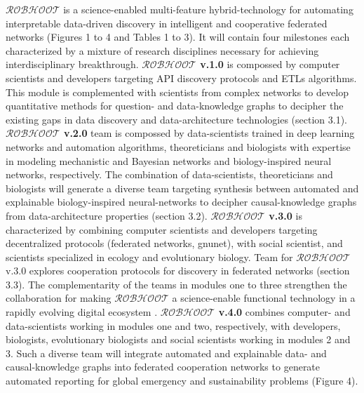 \documentclass[11pt, a4paper]{article} %
\begin{document}
  {\bf $\mathcal{ROBHOOT}$} is a science-enabled multi-feature
  hybrid-technology for automating interpretable data-driven discovery
  in intelligent and cooperative federated networks (Figures 1 to 4
  and Tables 1 to 3). It will contain four milestones each
  characterized by a mixture of research disciplines necessary for
  achieving interdisciplinary breakthrough. {\bf $\mathcal{ROBHOOT}$
    v.1.0} is compossed by computer scientists and developers
  targeting API discovery protocols and ETLs algorithms. This module
  is complemented with scientists from complex networks to develop
  quantitative methods for question- and data-knowledge graphs to
  decipher the existing gaps in data discovery and data-architecture
  technologies (section 3.1). {\bf $\mathcal{ROBHOOT}$ v.2.0} team is
  compossed by data-scientists trained in deep learning networks and
  automation algorithms, theoreticians and biologists with expertise
  in modeling mechanistic and Bayesian networks and biology-inspired
  neural networks, respectively. The combination of data-scientists,
  theoreticians and biologists will generate a diverse team targeting
  synthesis between automated and explainable biology-inspired
  neural-networks to decipher causal-knowledge graphs from
  data-architecture properties (section 3.2). {\bf $\mathcal{ROBHOOT}$
    v.3.0} is characterized by combining computer scientists and
  developers targeting decentralized protocols (federated networks,
  gnunet), with social scientist, and scientists specialized in
  ecology and evolutionary biology. Team for $\mathcal{ROBHOOT}$ v.3.0
  explores cooperation protocols for discovery in federated networks
  (section 3.3). The complementarity of the teams in modules one to
  three strengthen the collaboration for making $\mathcal{ROBHOOT}$ a
  science-enable functional technology in a rapidly evolving digital
  ecosystem \citep{Soto-Valero2019}. {\bf $\mathcal{ROBHOOT}$ v.4.0}
  combines computer- and data-scientists working in modules one and
  two, respectively, with developers, biologists, evolutionary
  biologists and social scientists working in modules 2 and 3. Such a
  diverse team will integrate automated and explainable data- and
  causal-knowledge graphs into federated cooperation networks to
  generate automated reporting for global emergency and sustainability
  problems (Figure 4).
\end{document}
